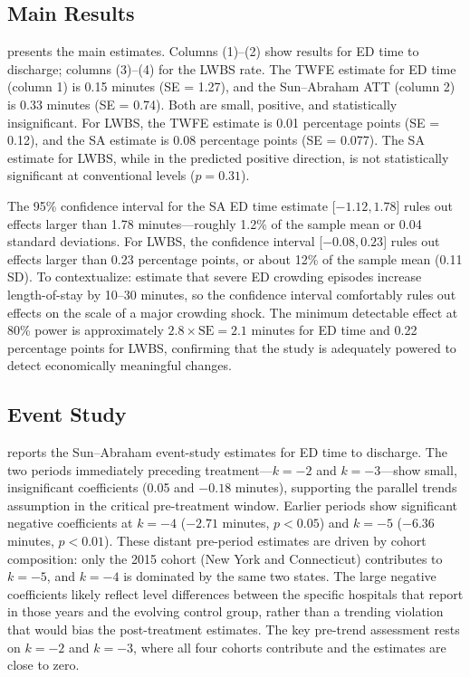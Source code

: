 \documentclass[12pt]{article}
\begin{document}
\subsection{Main Results}



 presents the main estimates. Columns (1)--(2) show results for ED time to discharge; columns (3)--(4) for the LWBS rate. The TWFE estimate for ED time (column 1) is 0.15 minutes (SE = 1.27), and the Sun--Abraham ATT (column 2) is 0.33 minutes (SE = 0.74). Both are small, positive, and statistically insignificant. For LWBS, the TWFE estimate is 0.01 percentage points (SE = 0.12), and the SA estimate is 0.08 percentage points (SE = 0.077). The SA estimate for LWBS, while in the predicted positive direction, is not statistically significant at conventional levels ($p = 0.31$).

The 95\% confidence interval for the SA ED time estimate [$-1.12, 1.78$] rules out effects larger than 1.78 minutes---roughly 1.2\% of the sample mean or 0.04 standard deviations. For LWBS, the confidence interval [$-0.08, 0.23$] rules out effects larger than 0.23 percentage points, or about 12\% of the sample mean (0.11 SD). To contextualize: \citet{mccarthy2009} estimate that severe ED crowding episodes increase length-of-stay by 10--30 minutes, so the confidence interval comfortably rules out effects on the scale of a major crowding shock. The minimum detectable effect at 80\% power is approximately $2.8 \times \text{SE} = 2.1$ minutes for ED time and 0.22 percentage points for LWBS, confirming that the study is adequately powered to detect economically meaningful changes.

\subsection{Event Study}



 reports the Sun--Abraham event-study estimates for ED time to discharge. The two periods immediately preceding treatment---$k = -2$ and $k = -3$---show small, insignificant coefficients (0.05 and $-0.18$ minutes), supporting the parallel trends assumption in the critical pre-treatment window. Earlier periods show significant negative coefficients at $k = -4$ ($-2.71$ minutes, $p < 0.05$) and $k = -5$ ($-6.36$ minutes, $p < 0.01$). These distant pre-period estimates are driven by cohort composition: only the 2015 cohort (New York and Connecticut) contributes to $k = -5$, and $k = -4$ is dominated by the same two states. The large negative coefficients likely reflect level differences between the specific hospitals that report in those years and the evolving control group, rather than a trending violation that would bias the post-treatment estimates. The key pre-trend assessment rests on $k = -2$ and $k = -3$, where all four cohorts contribute and the estimates are close to zero.
\end{document}
